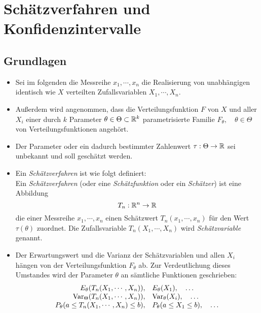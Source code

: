 \chapter{Schätzverfahren und Konfidenzintervalle}
    \section{Grundlagen}
        \begin{itemize}
        	\item Sei im folgenden die Messreihe \(x_1, \cdots, x_n\) die Realisierung von unabhängigen identisch wie \(X\) verteilten Zufallsvariablen \(X_1, \cdots, X_n\).
        	\item Außerdem wird angenommen, dass die Verteilungsfunktion \(F\) von \(X\) und aller \(X_i\) einer durch \(k\) Parameter \( \theta \in \Theta \subset \mathbb{R}^k \) parametrisierte Familie \( F_\theta, \quad \theta \in \Theta \) von Verteilungsfunktionen angehört.
        	\item Der Parameter oder ein dadurch bestimmter Zahlenwert \( \tau : \Theta \rightarrow \mathbb{R} \) sei unbekannt und soll geschätzt werden.
        	\item Ein \textit{Schätzverfahren} ist wie folgt definiert: \\ Ein \textit{Schätzverfahren} (oder eine \textit{Schätzfunktion} oder ein \textit{Schätzer}) ist eine Abbildung \[ T_n : \mathbb{R}^n \rightarrow \mathbb{R} \] die einer Messreihe \( x_1, \cdots, x_n \) einen Schätzwert \( T_n(x_1, \cdots, x_n) \) für den Wert \( \tau(\theta) \) zuordnet. Die Zufallsvariable \( T_n(X_1, \cdots, X_n) \) wird \textit{Schätzvariable} genannt.
        	\item Der Erwartungswert und die Varianz der Schätzvariablen und allen \(X_i\) hängen von der Verteilungsfunktion \(F_\theta\) ab. Zur Verdeutlichung dieses Umstandes wird der Parameter \(\theta\) an sämtliche Funktionen geschrieben:
            	\begin{equation*}
	            	\begin{array}{rl}
	            		              E_\theta(T_n(X_1, \cdots, X_n)), & E_\theta(X_1), \quad \dots               \\
	            		           \operatorname{Var}_\Theta(T_n(X_1, \cdots, X_n)), & \operatorname{Var}_\theta(X_i), \quad \dots            \\
	            		P_\theta(a \leq T_n(X_1, \cdots, X_n) \leq b), & P_\theta(a \leq X_1 \leq b), \quad \dots
	            	\end{array}
            	\end{equation*}
        \end{itemize}
    
